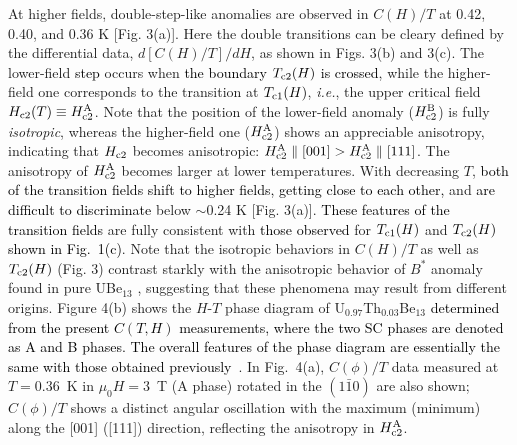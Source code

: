 \documentclass[twocolumn, prl]{revtex4}%
\newcommand{\correct}[1]{\textcolor{black}{#1}}
\begin{document}
At higher fields, double-step-like anomalies are observed  in $C(H)/T$ at 0.42, 0.40, and 0.36 K 
 [Fig. 3(a)].
Here the double transitions can be  cleary defined by the differential data, $d[C(H)/T]/dH$, 
  as shown in Figs. 3(b) and 3(c).
The lower-field \correct{step} occurs when \correct{the boundary} $T_{\rm c2}(H)$ \correct{is crossed},
 while the higher-field one  corresponds to the transition at  $T_{\rm c1}(H)$, \textit{i.e.}, the upper critical field 
 $H_{\rm c2}(T) \equiv H_{\rm c2}^{\rm A}$.
Note that the position of the lower-field anomaly 
 ($H_{\rm c2}^{\rm B}$)
 \color{black}
  is fully \textit{isotropic}, 
 whereas  the higher-field one 
 ($H_{\rm c2}^{\rm A}$)
 \color{black}  
shows an appreciable anisotropy, indicating that $H_{\rm c2}$ becomes anisotropic: 
 $H_{\rm c2}^{\rm A}  \parallel [001] > H_{\rm c2}^{\rm A} \parallel [111]$.
The anisotropy of 
 $H_{\rm c2}^{\rm A}$ 
becomes larger  at lower temperatures.
With decreasing $T$,  \correct{both of the transition fields shift to higher fields, getting close to each other,} and \correct{are difficult to discriminate} below  $\sim$0.24 K 
 [Fig. 3(a)].
   \color{black} 
\correct{These features of the transition fields} are fully consistent with \correct{those observed} for $T_{\rm c1}(H)$ and $T_{\rm c2}(H)$
\correct{shown in Fig.~1(c)}.
Note that   the  isotropic behaviors  in   $C(H)/T$ as well as $T_{\rm c2}(H)$ (Fig. 3)  
  contrast starkly with the anisotropic  behavior of  $B^*$ anomaly found  in pure UBe$_{13}$ 
 \cite{YShimizu_PRL_2015}, 
 suggesting that these phenomena may result from different origins. 
Figure 4(b) shows  the $H$-$T$ phase diagram of  U$_{0.97}$Th$_{0.03}$Be$_{13}$ \correct{determined from the present $C(T,H)$ measurements, where the two SC phases are denoted as A and B phases. 
The overall features of the phase diagram 
 are \color{black}
 essentially the same with those obtained previously~\cite{Ott_PRBR_1986,Kromer_PRB_2000,Jin_PRB_1996}}.
In Fig.~4(a), $C(\phi)/T$ data measured at  $T=0.36$~K in  $\mu_{0}H=3$~T  (A phase) rotated in the $(1\bar{1}0)$ are also shown; 
  $C(\phi)/T$ shows a distinct angular oscillation with the maximum (minimum) along the [001] ([111]) direction, reflecting the anisotropy in
     $H_{\rm c2}^{\rm A}$.
  \color{black}
\end{document}
